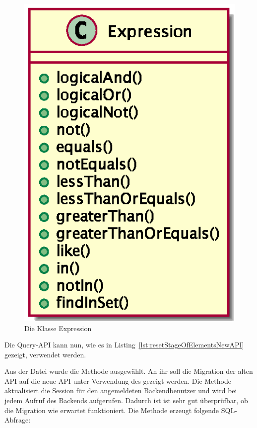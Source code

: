 \begin{figure}[H]
    \centering
    \includegraphics[scale=0.5]{gfx/uml/NewAPI/Expression.eps}
    \caption{Die Klasse Expression}
    \label{fig:expressionClass}
\end{figure}

Die Query-API kann nun, wie es in Listing~\ref{lst:resetStageOfElementsNewAPI} gezeigt, verwendet werden.

Aus der Datei  wurde die Methode  ausgewählt. An ihr soll die Migration der alten API auf die neue API unter Verwendung des  gezeigt werden. Die Methode aktualisiert die Session für den angemeldeten Backendbenutzer und wird bei jedem Aufruf des Backends aufgerufen. Dadurch ist ist sehr gut überprüfbar, ob die Migration wie erwartet funktioniert. Die Methode erzeugt folgende SQL-Abfrage: \\

